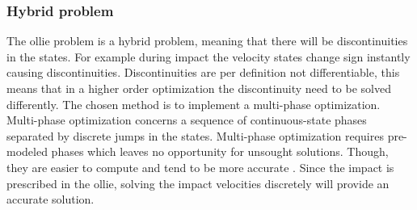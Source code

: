 \subsubsection{Hybrid problem}
\noindent The ollie problem is a hybrid problem, meaning that there will be discontinuities in the states. For example during impact the velocity states change sign instantly causing discontinuities. Discontinuities are per definition not differentiable, this means that in a higher order optimization the discontinuity need to be solved differently. The chosen method is to implement a multi-phase optimization. Multi-phase optimization concerns a sequence of continuous-state phases separated by discrete jumps in the states. Multi-phase optimization requires pre-modeled phases which leaves no opportunity for unsought solutions. Though, they are easier to compute and tend to be more accurate \cite{kelly_introduction_2017}. Since the impact is prescribed in the ollie, solving the impact velocities discretely will provide an accurate solution.

